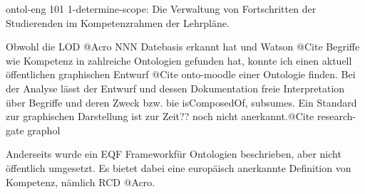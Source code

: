 \documentclass[
12pt,
english,
ngerman,
headsepline,
twoside,
openright,
numbers=noenddot,version=first
]{scrreprt}
\begin{document}
ontol-eng 101
1-determine-scope: 
Die Verwaltung von Fortschritten der Studierenden im Kompetenzrahmen der Lehrpläne.

Obwohl die LOD @Acro NNN Datebasis erkannt hat und Watson @Cite Begriffe wie Kompetenz in zahlreiche Ontologien gefunden hat, konnte ich einen aktuell öffentlichen graphischen Entwurf\cite{OntoMoodle} @Cite onto-moodle einer Ontologie finden. 
Bei der Analyse lässt der Entwurf und dessen Dokumentation freie Interpretation über Begriffe und deren Zweck bzw. bie \glqq isComposedOf\grqq, \glqq subsumes\grqq. Ein Standard zur graphischen Darstellung ist zur Zeit?? noch nicht anerkannt.@Cite research-gate graphol

Anderseits wurde ein \glqq EQF Framework\grqq für Ontologien beschrieben, aber nicht öffentlich umgesetzt. Es bietet dabei eine europäisch anerkannte Definition von Kompetenz, nämlich RCD @Acro.
\end{document}
